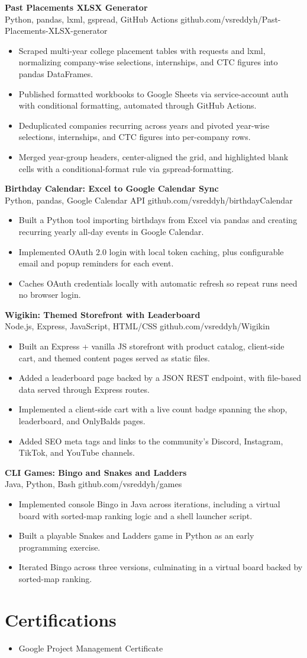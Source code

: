 \documentclass[a4paper,11pt]{article}
\newcommand{\resumeItem}[1]{\item \small{#1}}
\newcommand{\resumeSubheading}[4]{%
  \textbf{#1} \hfill \textbf{#2} \\
{#3} \hfill {#4}
}
\newcommand{\resumeSubHeadingListStart}{\begin{itemize}}
\newcommand{\resumeSubHeadingListEnd}{\end{itemize}}
\begin{document}
\resumeSubheading
{Past Placements XLSX Generator}{}{Python, pandas, lxml, gspread, GitHub Actions}{github.com/vsreddyh/Past-Placements-XLSX-generator}
\resumeSubHeadingListStart
\resumeItem{Scraped multi-year college placement tables with requests and lxml, normalizing company-wise selections, internships, and CTC figures into pandas DataFrames.}
\resumeItem{Published formatted workbooks to Google Sheets via service-account auth with conditional formatting, automated through GitHub Actions.}
\resumeItem{Deduplicated companies recurring across years and pivoted year-wise selections, internships, and CTC figures into per-company rows.}
\resumeItem{Merged year-group headers, center-aligned the grid, and highlighted blank cells with a conditional-format rule via gspread-formatting.}
\resumeSubHeadingListEnd

\resumeSubheading
{Birthday Calendar: Excel to Google Calendar Sync}{}{Python, pandas, Google Calendar API}{github.com/vsreddyh/birthdayCalendar}
\resumeSubHeadingListStart
\resumeItem{Built a Python tool importing birthdays from Excel via pandas and creating recurring yearly all-day events in Google Calendar.}
\resumeItem{Implemented OAuth 2.0 login with local token caching, plus configurable email and popup reminders for each event.}
\resumeItem{Caches OAuth credentials locally with automatic refresh so repeat runs need no browser login.}
\resumeSubHeadingListEnd

\resumeSubheading
{Wigikin: Themed Storefront with Leaderboard}{}{Node.js, Express, JavaScript, HTML/CSS}{github.com/vsreddyh/Wigikin}
\resumeSubHeadingListStart
\resumeItem{Built an Express + vanilla JS storefront with product catalog, client-side cart, and themed content pages served as static files.}
\resumeItem{Added a leaderboard page backed by a JSON REST endpoint, with file-based data served through Express routes.}
\resumeItem{Implemented a client-side cart with a live count badge spanning the shop, leaderboard, and OnlyBalds pages.}
\resumeItem{Added SEO meta tags and links to the community's Discord, Instagram, TikTok, and YouTube channels.}
\resumeSubHeadingListEnd

\resumeSubheading
{CLI Games: Bingo and Snakes and Ladders}{}{Java, Python, Bash}{github.com/vsreddyh/games}
\resumeSubHeadingListStart
\resumeItem{Implemented console Bingo in Java across iterations, including a virtual board with sorted-map ranking logic and a shell launcher script.}
\resumeItem{Built a playable Snakes and Ladders game in Python as an early programming exercise.}
\resumeItem{Iterated Bingo across three versions, culminating in a virtual board backed by sorted-map ranking.}
\resumeSubHeadingListEnd


\vspace{-0.6em}




\section*{Certifications}
\begin{itemize}
\resumeItem{Google Project Management Certificate}
\end{itemize}
\end{document}

